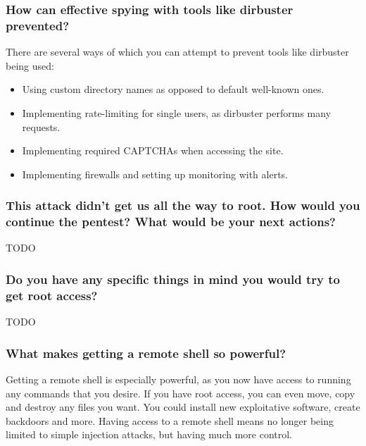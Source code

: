 \subsubsection{How can effective spying with tools like dirbuster prevented?}
There are several ways of which you can attempt to prevent tools like dirbuster being used:

\begin{itemize}
  \item Using custom directory names as opposed to default well-known ones.
  \item Implementing rate-limiting for single users, as dirbuster performs many requests.
  \item Implementing required CAPTCHAs when accessing the site.
  \item Implementing firewalls and setting up monitoring with alerts.
\end{itemize}

\subsubsection{This attack didn't get us all the way to root. How would you continue the pentest? What would be your next actions?}
TODO

\subsubsection{Do you have any specific things in mind you would try to get root access?}
TODO

\subsubsection{What makes getting a remote shell so powerful?}
Getting a remote shell is especially powerful, as you now have access to running any commands that you desire. If you have root access, you can even move, copy and destroy any files you want. You could install new exploitative software, create backdoors and more. Having access to a remote shell means no longer being limited to simple injection attacks, but having much more control.